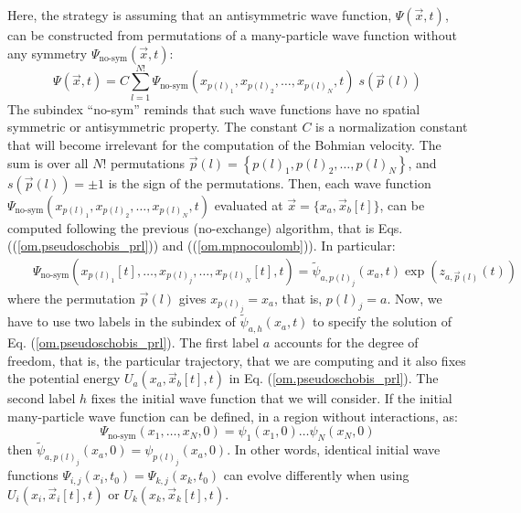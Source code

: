 \documentclass[onecolumn,nofootinbib, secnumarabic, amsmath, nobibnotes,12pt,aps,pra]{revtex4-1}
\newcommand{\pref}[1]{(\ref{#1})}
\newcommand{\eref}[1]{Eq. (\ref{#1})}
\begin{document}
Here, the strategy is assuming that an antisymmetric wave function,
$\Psi (\vec x,t)$, can be constructed from permutations of a
many-particle wave function without any symmetry $\Psi_\textrm{no-sym}(\vec
x,t)$:
\begin{equation}
\label{om.prl_sumexbis}
\Psi(\vec{x},{t}) = C \sum\limits_{l = 1}^{N!} \Psi_\textrm{no-sym}(x_{p(l)_1},x_{p(l)_2}, \ldots ,x_{p(l)_N},t) \; s\left( \vec{p}(l) \right)
\end{equation}
The subindex ``no-sym'' reminds that such wave functions have no
spatial symmetric or antisymmetric property. The constant $C$ is a
normalization constant that will become irrelevant for the
computation of the Bohmian velocity. The sum is over all $N!$
permutations $\vec{p}(l) = \left\{
p{{(l)}_{1}},p{{(l)}_{2}},\ldots,p{{(l)}_{N}} \right\}$, and
$s\left( \vec{p}(l) \right) = \pm 1$ is the sign of the
permutations. Then, each wave function
$\Psi_\textrm{no-sym}(x_{p(l)_1},x_{p(l)_2}, \ldots , x_{p(l)_N},t)$
evaluated at $\vec x = \{x_a,\vec x_b[t]\}$, can be computed
following the previous (no-exchange) algorithm, that is  Eqs.
(\pref{om.pseudoschobis_prl}) and (\pref{om.mpnocoulomb}). In
particular:
\begin{eqnarray}
\label{om.prl_def}
&&\Psi_\textrm{no-sym}(x_{p(l)_1}[t],\ldots , x_{p(l)_j},\ldots ,
x_{p(l)_N}[t],t) = \tilde{\psi}_{a,{p}(l)_j}(x_a,t) \exp { (z_{a,\vec{p}(l)}(t)) }
\end{eqnarray}
where the permutation $\vec p(l)$ gives $x_{p(l)_j} = x_a$, that is, ${p(l)_j} = a$. Now, we have to use two labels in the subindex of $\tilde{\psi}_{a,h}(x_a,t)$ to specify the solution of \eref{om.pseudoschobis_prl}. The first label $a$ accounts for the degree of freedom, that is, the particular trajectory, that we are computing and it also fixes the potential energy $U_{a}(x_{a},\vec x_{b}[t],t)$ in \eref{om.pseudoschobis_prl}. The second label $h$ fixes the initial wave function that we will consider. If the initial many-particle wave function can be defined, in a region without interactions, as:
\begin{equation}
\label{om.prl_defini}
\Psi_\textrm{no-sym}(x_{1}, \ldots ,x_{N},0) = \psi_1(x_1,0) \ldots\psi_N(x_N,0)
\end{equation}
then $\tilde{\psi}_{a,{p}(l)_j}(x_a,0) = \psi_{p(l)_j}(x_a,0)$. In other words, identical initial wave functions $\Psi_{i,j}(x_{i},t_{0}) = \Psi_{k,j}(x_{k},t_{0})$ can evolve differently when using $U_{i}(x_{i},\vec{x}_{i}[t],t)$ or $U_{k}(x_{k},\vec{x}_{k}[t],t)$.
\end{document}
